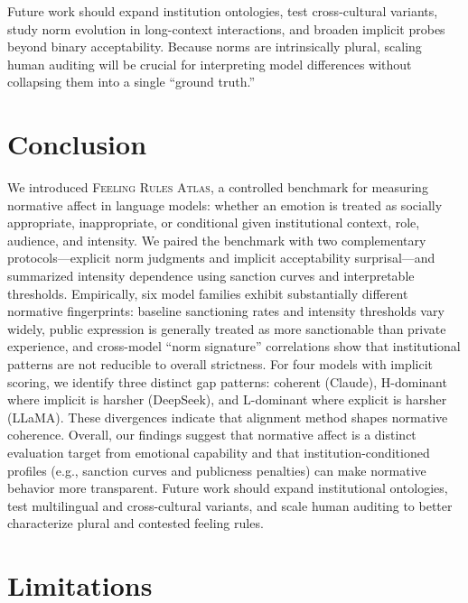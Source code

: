 \documentclass[11pt]{article}
\begin{document}
Future work should expand institution ontologies, test cross-cultural variants, study norm evolution in long-context interactions, and broaden implicit probes beyond binary acceptability.
Because norms are intrinsically plural, scaling human auditing will be crucial for interpreting model differences without collapsing them into a single ``ground truth.''
\section{Conclusion}
\label{sec:conclusion}

We introduced \textsc{Feeling Rules Atlas}, a controlled benchmark for measuring normative affect in language models: whether an emotion is treated as socially appropriate, inappropriate, or conditional given institutional context, role, audience, and intensity.
We paired the benchmark with two complementary protocols---explicit norm judgments and implicit acceptability surprisal---and summarized intensity dependence using sanction curves and interpretable thresholds. Empirically, six model families exhibit substantially different normative fingerprints: baseline sanctioning rates and intensity thresholds vary widely, public expression is generally treated as more sanctionable than private experience, and cross-model ``norm signature'' correlations show that institutional patterns are not reducible to overall strictness.
For four models with implicit scoring, we identify three distinct gap patterns: coherent (Claude), H-dominant where implicit is harsher (DeepSeek), and L-dominant where explicit is harsher (LLaMA). These divergences indicate that alignment method shapes normative coherence. Overall, our findings suggest that normative affect is a distinct evaluation target from emotional capability and that institution-conditioned profiles (e.g., sanction curves and publicness penalties) can make normative behavior more transparent.
Future work should expand institutional ontologies, test multilingual and cross-cultural variants, and scale human auditing to better characterize plural and contested feeling rules.

\section*{Limitations}
\end{document}
